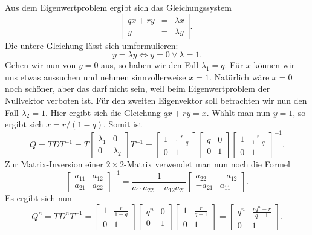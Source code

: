 \documentclass[a4paper,10pt,fleqn,twoside]{scrartcl}
\numberwithin{equation}{section}
\theoremstyle{Aufgabe}
\begin{document}
Aus dem Eigenwertproblem ergibt sich das Gleichungssystem
\[\left|
\begin{array}{rcl}
qx+ry &=& \lambda x\\
y &=& \lambda y
\end{array}\right|.\]
Die untere Gleichung lässt sich umformulieren:
\[y=\lambda y \iff y=0\lor \lambda=1.\]
Gehen wir nun von $y=0$ aus, so haben wir den Fall $\lambda_1=q$.
Für $x$ können wir uns etwas aussuchen und nehmen sinnvollerweise
$x=1$. Natürlich wäre $x=0$ noch schöner, aber das darf nicht sein,
weil beim Eigenwertproblem der Nullvektor verboten ist. Für
den zweiten Eigenvektor soll betrachten wir nun den Fall $\lambda_2=1$.
Hier ergibt sich die Gleichung $qx+ry=x$. Wählt man nun $y=1$, so
ergibt sich $x=r/(1-q)$. Somit ist
\[
Q = TDT^{-1}
= T\begin{bmatrix}
\lambda_1 & 0\\
0 & \lambda_2
\end{bmatrix}T^{-1}
= \begin{bmatrix}
1 & \frac{r}{1-q}\\
0 & 1
\end{bmatrix}\begin{bmatrix}
q & 0\\
0 & 1
\end{bmatrix}\begin{bmatrix}
1 & \frac{r}{1-q}\\
0 & 1
\end{bmatrix}^{-1}.
\]
Zur Matrix-Inversion einer $2{\times}2$-Matrix verwendet man nun noch
die Formel
\[
\begin{bmatrix}
a_{11} & a_{12}\\
a_{21} & a_{22}
\end{bmatrix}^{-1}
= \frac{1}{a_{11}a_{22}-a_{12}a_{21}}
\begin{bmatrix}
a_{22} & -a_{12}\\
-a_{21} & a_{11}
\end{bmatrix}.
\]
Es ergibt sich nun
\[Q^n = TD^nT^{-1}
= \begin{bmatrix}
1 & \frac{r}{1-q}\\
0 & 1
\end{bmatrix}\begin{bmatrix}
q^n & 0\\
0 & 1
\end{bmatrix}\begin{bmatrix}
1 & \frac{r}{q-1}\\
0 & 1
\end{bmatrix}
= \begin{bmatrix}
q^n & \frac{rq^n-r}{q-1}\\
0 & 1
\end{bmatrix}.
\]
\end{document}
